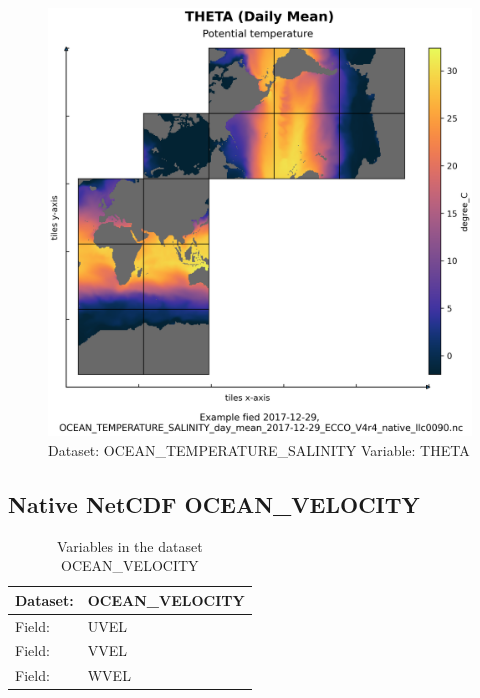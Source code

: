 \begin{figure}[H]
\centering
\includegraphics[width=\textwidth]{../images/plots/native_plots/Ocean_Temperature_and_Salinity/THETA.png}
\caption{Dataset: OCEAN\_TEMPERATURE\_SALINITY Variable: THETA}
\label{tab:table-OCEAN_TEMPERATURE_SALINITY_THETA-Plot}
\end{figure}
\pagebreak
\subsection{Native NetCDF OCEAN\_VELOCITY}
\newp
\begin{longtable}{|p{}|p{}|}
\caption{Variables in the dataset OCEAN\_VELOCITY}
\label{tab:table-OCEAN_VELOCITY-fields} \\ 
\hline \endhead \hline \endfoot
\rowcolor{lightgray} \textbf{Dataset:} & \textbf{OCEAN\_VELOCITY} \\ \hline
Field: &UVEL \\ \hline
Field: &VVEL \\ \hline
Field: &WVEL \\ \hline
\end{longtable}

\pagebreak
